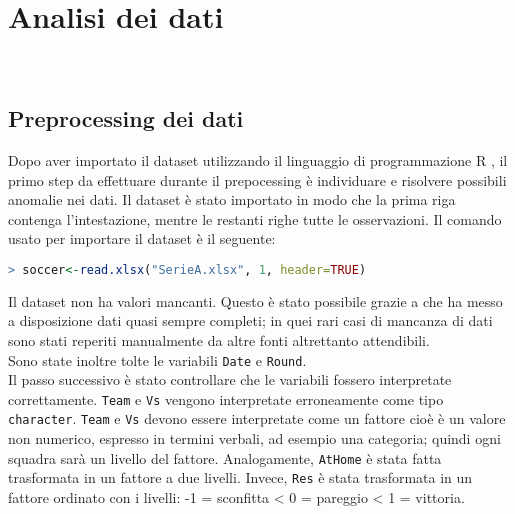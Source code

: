 
\chapter{Analisi dei dati}
\label{cap:Analisi}
\\


\section{Preprocessing dei dati}
Dopo aver importato il dataset utilizzando il linguaggio di programmazione R \autocite{R-language}, il primo step da effettuare durante il prepocessing è individuare e risolvere possibili anomalie nei dati.
Il dataset è stato importato in modo che la prima riga contenga l'intestazione, mentre le restanti righe tutte le osservazioni. Il comando usato per importare il dataset è il seguente:\\

\begin{lstlisting}[language=R]
> soccer<-read.xlsx("SerieA.xlsx", 1, header=TRUE)
\end{lstlisting}
\bigskip
Il dataset non ha valori mancanti. Questo è stato possibile grazie a \texttt{\cite{fbref}} che ha messo a disposizione dati quasi sempre completi; in quei rari casi di mancanza di dati sono stati reperiti manualmente da altre fonti altrettanto attendibili.\\ 
Sono state inoltre tolte le variabili \texttt{Date} e \texttt{Round}.\\
Il passo successivo è stato controllare che le variabili fossero interpretate correttamente. \texttt{Team} e \texttt{Vs} vengono interpretate erroneamente come tipo \texttt{character}. \texttt{Team} e \texttt{Vs} devono essere interpretate come un fattore cioè è un valore non numerico, espresso in termini verbali, ad esempio una categoria; quindi ogni squadra sarà un livello del fattore. Analogamente, \texttt{AtHome} è stata fatta trasformata in un fattore a due livelli. Invece, \texttt{Res} è stata trasformata in un fattore ordinato con i livelli: -1 = sconfitta <  0 = pareggio < 1 = vittoria.


